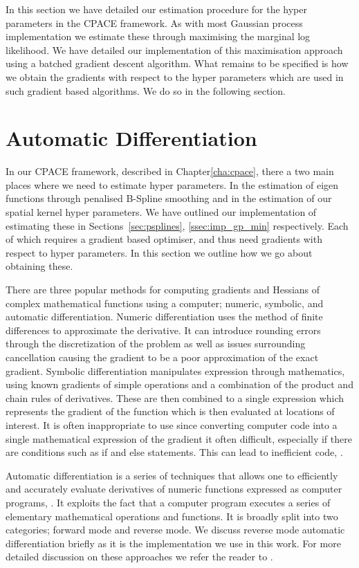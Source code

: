 In this section we have detailed our estimation procedure for the hyper parameters in the CPACE framework.
As with most Gaussian process implementation we estimate these through maximising the marginal log likelihood.
We have detailed our implementation of this maximisation approach using a batched gradient descent algorithm. 
What remains to be specified is how we obtain the gradients with respect to the hyper parameters which are used in such gradient based algorithms.
We do so in the following section.

\section{Automatic Differentiation \label{sec:auto_diff}}
In our CPACE framework, described in Chapter\ref{cha:cpace}, there a two main places where we need to estimate hyper parameters.
In the estimation of eigen functions through penalised B-Spline smoothing and in the estimation of our spatial kernel hyper parameters.
We have outlined our implementation of estimating these in Sections~\ref{sec:psplines}, \ref{ssec:imp_gp_min} respectively.
Each of which requires a gradient based optimiser, and thus need gradients with respect to hyper parameters.
In this section we outline how we go about obtaining these.

There are three popular methods for computing gradients and Hessians of complex mathematical functions using a computer; numeric, symbolic, and automatic differentiation.
Numeric differentiation uses the method of finite differences to approximate the derivative.
It can introduce rounding errors through the discretization of the problem as well as issues surrounding cancellation causing the gradient to be a poor approximation of the exact gradient.
Symbolic differentiation manipulates expression through mathematics, using known gradients of simple operations and a combination of the product and chain rules of derivatives.
These are then combined to a single expression which represents the gradient of the function which is then evaluated at locations of interest.
It is often inappropriate to use since converting computer code into a single mathematical expression of the gradient it often difficult, especially if there are conditions such as if and else statements. 
This can lead to inefficient code, \citep{baydin_automatic_2018}.

Automatic differentiation is a series of techniques that allows one to efficiently and accurately evaluate derivatives of numeric functions expressed as computer programs, \citep{neidinger_introduction_2010}.
It exploits the fact that a computer program executes a series of elementary mathematical operations and functions.
It is broadly split into two categories; forward mode and reverse mode.
We discuss reverse mode automatic differentiation briefly as it is the implementation we use in this work.
For more detailed discussion on these approaches we refer the reader to \citep{neidinger_introduction_2010}.

